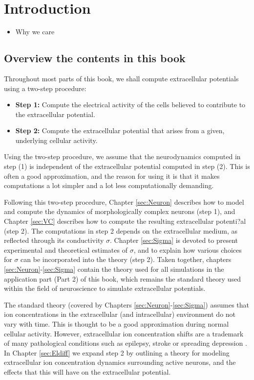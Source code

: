 \section{Introduction} 
\label{sec:Intro}

\begin{itemize}
\item Why we care \citep{Buzsaki2012,Pettersen2012,Einevoll2013,Einevoll2013a,Einevoll2019}
\end{itemize}


\subsection{Overview the contents in this book}
Throughout most parts of this book, we shall compute extracellular potentials using a two-step procedure:  

\begin{itemize}
\item {\bf Step 1:} Compute the electrical activity of the cells believed to contribute to the extracellular potential. 
\item {\bf Step 2:} Compute the extracellular potential that arises from a given, underlying cellular activity.
\end{itemize}

Using the two-step procedure, we assume that the neurodynamics computed in step (1) is independent of the extracellular potential computed in step (2). This is often a good approximation, and the reason for using it is that it makes computations a lot simpler and a lot less computationally demanding. 

Following this two-step procedure, Chapter \ref{sec:Neuron} describes how to model and compute the dynamics of morphologically complex neurons (step 1), and Chapter \ref{sec:VC} describes how to compute the resulting extracellular potenti?al (step 2). The computations in step 2 depends on the extracellular medium, as reflected through its conductivity $\sigma$. Chapter \ref{sec:Sigma} is devoted to present experimental and theoretical estimates of $\sigma$, and to explain how various choices for  $\sigma$ can be incorporated into the theory (step 2). Taken together, chapters \ref{sec:Neuron}-\ref{sec:Sigma} contain the theory used for all simulations in the application part (Part 2) of this book, which remains the standard theory used within the field of neuroscience to simulate extracellular potentials. 

The standard theory (covered by Chapters \ref{sec:Neuron}-\ref{sec:Sigma}) assumes that ion concentrations in the extracellular (and intracellular) environment do not vary with time. This is thought to be a good approximation during normal cellular activity. However, extracellular ion concentration shifts are a trademark of many pathological conditions such as epilepsy, stroke or spreading depression \citep{Somjen2001, Frohlich2008, Zandt2015review, Ayata2015}. In Chapter \ref{sec:Eldiff} we expand step 2 by outlining a theory for modeling extracellular ion concentration dynamics surrounding active neurons, and the effects that this will have on the extracellular potential. 

